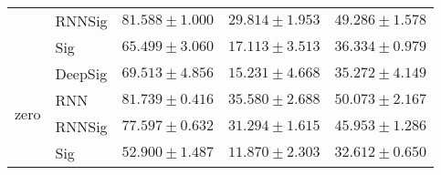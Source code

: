 \begin{tabular}{lllll}
                                 & RNNSig  &                           $ 81.588 \pm 1.000 $ &                           $ 29.814 \pm 1.953 $ &                           $ 49.286 \pm 1.578 $ \\
                                 & Sig     &                           $ 65.499 \pm 3.060 $ &                           $ 17.113 \pm 3.513 $ &                           $ 36.334 \pm 0.979 $ \\
\midrule
\multirow{4}{*}{zero}            & DeepSig &                           $ 69.513 \pm 4.856 $ &                           $ 15.231 \pm 4.668 $ &                           $ 35.272 \pm 4.149 $ \\
                                 & RNN     &                           $ 81.739 \pm 0.416 $ &                           $ 35.580 \pm 2.688 $ &                           $ 50.073 \pm 2.167 $ \\
                                 & RNNSig  &                           $ 77.597 \pm 0.632 $ &                           $ 31.294 \pm 1.615 $ &                           $ 45.953 \pm 1.286 $ \\
                                 & Sig     &                           $ 52.900 \pm 1.487 $ &                           $ 11.870 \pm 2.303 $ &                           $ 32.612 \pm 0.650 $ \\
\bottomrule
\end{tabular}
